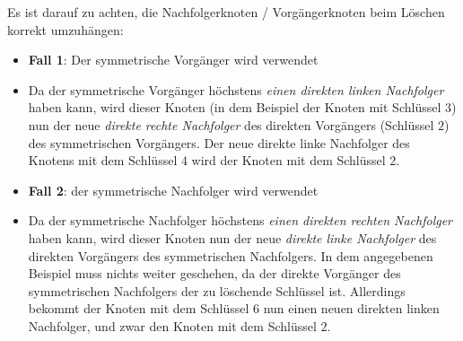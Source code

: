 \noindent
Es ist darauf zu achten, die Nachfolgerknoten / Vorgängerknoten beim Löschen korrekt umzuhängen:
\begin{itemize}
    \item \textbf{Fall 1}: Der symmetrische Vorgänger wird verwendet
    \item [] Da der symmetrische Vorgänger höchstens \textit{einen direkten linken Nachfolger} haben kann, wird dieser Knoten (in dem Beispiel der Knoten mit Schlüssel $3$) nun der neue \textit{direkte rechte Nachfolger} des direkten Vorgängers (Schlüssel $2$) des symmetrischen Vorgängers.
    Der neue direkte linke Nachfolger des Knotens mit dem Schlüssel $4$ wird der Knoten mit dem Schlüssel $2$.
    \item \textbf{Fall 2}: der symmetrische Nachfolger wird verwendet
    \item[] Da der symmetrische Nachfolger höchstens \textit{einen direkten rechten Nachfolger} haben kann, wird dieser Knoten nun der neue \textit{direkte linke Nachfolger} des direkten Vorgängers des symmetrischen Nachfolgers.
    In dem angegebenen Beispiel muss nichts weiter geschehen, da der direkte Vorgänger des symmetrischen Nachfolgers der zu löschende Schlüssel ist.
    Allerdings bekommt der Knoten mit dem Schlüssel $6$ nun einen neuen direkten linken Nachfolger, und zwar den Knoten mit dem Schlüssel $2$.
\end{itemize}\\


